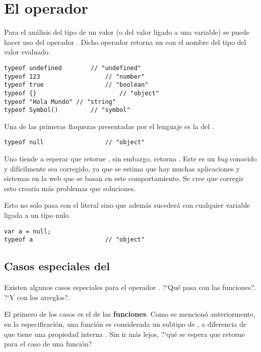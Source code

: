 \section{El operador }

Para el análisis del tipo de un valor (o del valor ligado a una variable) se puede hacer uso del operador . Dicho operador retorna un  con el nombre del tipo del valor evaluado.

\begin{lstlisting}[title={Analizando los tipos con \code{typeof}}]
typeof undefined		// "undefined"
typeof 123					// "number"
typeof true					// "boolean"
typeof {}						// "object"
typeof "Hola Mundo" // "string"
typeof Symbol()			// "symbol"
\end{lstlisting}

Una de las primeras flaquezas presentadas por el lenguaje es la del . 

\begin{lstlisting}[title={Analizando \code{typeof null}}]
typeof null					// "object"
\end{lstlisting}

Uno tiende a esperar que  retorne , sin embargo, retorna . Este es un \textit{bug} conocido y difícilmente sea corregido, ya que se estima que hay muchas aplicaciones y sistemas en la web que se basan en este comportamiento. Se cree que corregir esto crearía más problemas que soluciones.

Esto no solo pasa con el literal  sino que además sucederá con cualquier variable ligada a un tipo nulo.

\begin{lstlisting}[title={Analizando \code{typeof null} (cont.)}]
var a = null;
typeof a					// "object"
\end{lstlisting}

\subsection{Casos especiales del }

Existen algunos casos especiales para el operador . ?`Qué pasa con las funciones?. ?`Y con los arreglos?. 

El primero de los casos es el de las \textbf{funciones}. Como se mencionó anteriormente, en la especificación, una función es considerada un subtipo de , a diferencia de que tiene una propiedad interna \code{[[Call]]}. Sin ir más lejos, ?`qué se espera que retorne  para el caso de una función?

